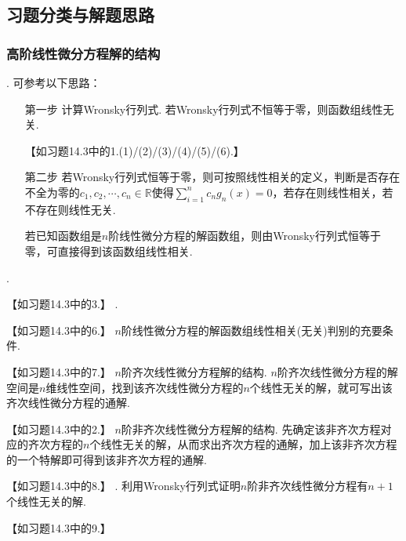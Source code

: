 \documentclass[12pt,UTF8]{ctexart}
\begin{document}
\subsection{习题分类与解题思路}
\subsubsection{高阶线性微分方程解的结构}
\begin{enumerate}
. 可参考以下思路：
\begin{enumerate}
\item[第一步]计算Wronsky行列式. 若Wronsky行列式不恒等于零，则函数组线性无关.

【如习题14.3中的1.(1)/(2)/(3)/(4)/(5)/(6).】
\item[第二步]若Wronsky行列式恒等于零，则可按照线性相关的定义，判断是否存在不全为零的$c_1,c_2,\cdots,c_n\in\mathbb R$使得$\sum_{i=1}^nc_ng_n(x)=0$，若存在则线性相关，若不存在则线性无关.

若已知函数组是$n$阶线性微分方程的解函数组，则由Wronsky行列式恒等于零，可直接得到该函数组线性相关.
\end{enumerate}
. 

【如习题14.3中的3.】
.

【如习题14.3中的6.】
$n$阶线性微分方程的解函数组线性相关(无关)判别的充要条件.

【如习题14.3中的7.】
$n$阶齐次线性微分方程解的结构. $n$阶齐次线性微分方程的解空间是$n$维线性空间，找到该齐次线性微分方程的$n$个线性无关的解，就可写出该齐次线性微分方程的通解.

【如习题14.3中的2.】
$n$阶非齐次线性微分方程解的结构. 先确定该非齐次方程对应的齐次方程的$n$个线性无关的解，从而求出齐次方程的通解，加上该非齐次方程的一个特解即可得到该非齐次方程的通解.

【如习题14.3中的8.】
. 利用Wronsky行列式证明$n$阶非齐次线性微分方程有$n+1$个线性无关的解.

【如习题14.3中的9.】
\end{enumerate}
\end{document}
